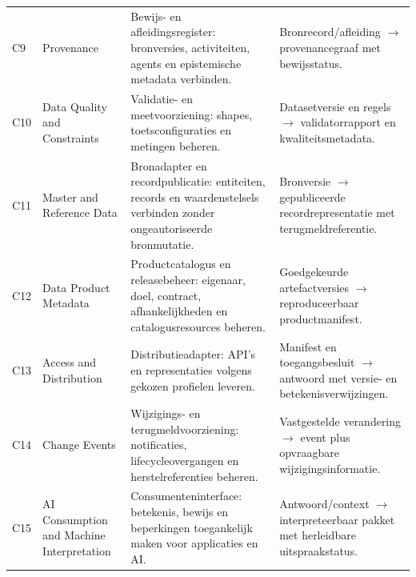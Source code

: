 \begin{longtable}{@{}P{.075\linewidth}P{.24\linewidth}P{.34\linewidth}P{.25\linewidth}@{}}
C9 & Provenance & Bewijs- en afleidingsregister: bronversies, activiteiten, agents en epistemische metadata verbinden. & Bronrecord/afleiding $\rightarrow$ provenancegraaf met bewijsstatus. \\
C10 & Data Quality and Constraints & Validatie- en meetvoorziening: shapes, toetsconfiguraties en metingen beheren. & Datasetversie en regels $\rightarrow$ validatorrapport en kwaliteitsmetadata. \\
C11 & Master and Reference Data & Bronadapter en recordpublicatie: entiteiten, records en waardenstelsels verbinden zonder ongeautoriseerde bronmutatie. & Bronversie $\rightarrow$ gepubliceerde recordrepresentatie met terugmeldreferentie. \\
C12 & Data Product Metadata & Productcatalogus en releasebeheer: eigenaar, doel, contract, afhankelijkheden en catalogusresources beheren. & Goedgekeurde artefactversies $\rightarrow$ reproduceerbaar productmanifest. \\
C13 & Access and Distribution & Distributieadapter: API’s en representaties volgens gekozen profielen leveren. & Manifest en toegangsbesluit $\rightarrow$ antwoord met versie- en betekenisverwijzingen. \\
C14 & Change Events & Wijzigings- en terugmeldvoorziening: notificaties, lifecycleovergangen en herstelreferenties beheren. & Vastgestelde verandering $\rightarrow$ event plus opvraagbare wijzigingsinformatie. \\
C15 & AI Consumption and Machine Interpretation & Consumenteninterface: betekenis, bewijs en beperkingen toegankelijk maken voor applicaties en AI. & Antwoord/context $\rightarrow$ interpreteerbaar pakket met herleidbare uitspraakstatus. \\
\bottomrule
\end{longtable}
\endgroup

